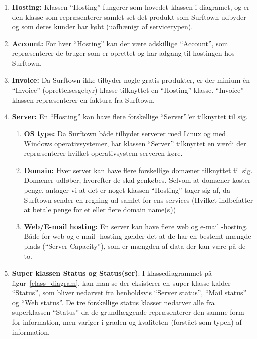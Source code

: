\documentclass[12pt]{article}
\begin{document}
\begin{enumerate}
	\item{\textbf{Hosting: }Klassen ``Hosting'' fungerer som hovedet klassen i diagramet, og er den klasse som repræsenterer samlet set det produkt som Surftown udbyder og som deres kunder har købt (uafhænigt af servicetypen).}
	\item{\textbf{Account: }For hver ``Hosting'' kan der være adskillige ``Account'', som repræsenterer de bruger som er oprettet og har adgang til hostingen hos Surftown.}
	\item{\textbf{Invoice: }Da Surftown ikke tilbyder nogle gratis produkter, er der minium èn ``Invoice'' (oprettelsesgebyr)  klasse tilknyttet en ``Hosting'' klasse. ``Invoice'' klassen repræsenterer en faktura fra Surftown.}
	\item{\textbf{Server: }En ``Hosting'' kan have flere forskellige ``Server'''er tilknyttet til sig.
	}\begin{enumerate}
		\item{\textbf{OS type: }Da Surftown både tilbyder serverer med Linux og med Windows operativsystemer, har klassen ``Server'' tilknyttet en værdi der repræsenterer hvilket operativsystem serveren køre.}
		\item{\textbf{Domain: }Hver server kan have flere forskellige domæner tilknyttet til sig. Domæner udløber, hvorefter de skal genkøbes. Selvom at domæner koster penge, antager vi at det er noget klassen ``Hosting'' tager sig af, da Surftown sender en regning ud samlet for ens services (Hvilket indbefatter at betale penge for et eller flere domain name(s))}
	\item{\textbf{Web/E-mail hosting: } En server kan have flere web og e-mail -hosting. Både for web og e-mail -hosting gælder det at de har en bestemt mængde plads (``Server Capacity''), som er mængden af data der kan være på de to.}
	\end{enumerate}
	\item{\textbf{Super klassen Status og Status(ser)}: } I klassediagrammet på figur~\ref{class_diagram}, kan man se der eksisterer en super klasse kalder ``Status'', som bliver nedarvet fra henholdsvis ``Server status'', ``Mail status'' og ``Web status''. De tre forskellige status klasser nedarver alle fra superklassen ``Status'' da de grundlæggende repræsenterer den samme form for information, men variger i graden og kvaliteten (forstået som typen) af information.
\end{enumerate}
\end{document}

